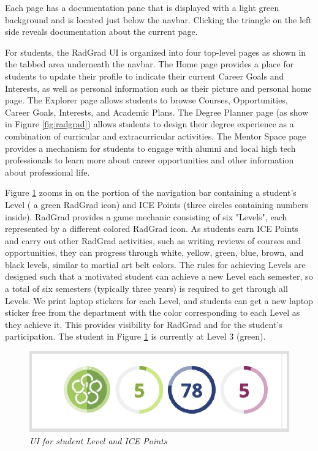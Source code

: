 \documentclass[acmsmall]{acmart}
\begin{document}
Each page has a documentation pane that is displayed with a light green background and is located just below the navbar. Clicking the triangle on the left side reveals documentation about the current page.

For students, the RadGrad UI is organized into four top-level pages as shown in the tabbed area underneath the navbar.  The Home page provides a place for students to update their profile to indicate their current Career Goals and Interests, as well as personal information such as their picture and personal home page.  The Explorer page allows students to browse Courses, Opportunities, Career Goals, Interests, and Academic Plans.  The Degree Planner page (as show in Figure \ref{fig:radgrad}) allows students to design their degree experience as a combination of curricular and extracurricular activities.  The Mentor Space page provides a mechanism for students to engage with alumni and local high tech professionals to learn more about career opportunities and other information about professional life.

Figure \ref{fig:ice} zooms in on the portion of the navigation bar containing a student's Level ( a green RadGrad icon) and ICE Points (three circles containing numbers inside). RadGrad provides a game mechanic consisting of six "Levels", each represented by a different colored RadGrad icon. As students earn ICE Points and carry out other RadGrad activities, such as writing reviews of courses and opportunities, they can progress through white, yellow, green, blue, brown, and black levels, similar to martial art belt colors. The rules for achieving Levels are designed such that a motivated student can achieve a new Level each semester, so a total of six semesters (typically three years) is required to get through all Levels. We print laptop stickers for each Level, and students can get a new laptop sticker free from the department with the color corresponding to each Level as they achieve it. This provides visibility for RadGrad and for the student's participation.  The student in Figure \ref{fig:ice} is currently at Level 3 (green).

\begin{figure}[h]
\centering
\includegraphics[width=\linewidth]{ice-points-navbar.png.eps}
\caption{\em UI for student Level and ICE Points}
\label{fig:ice}
\end{figure}
\end{document}
